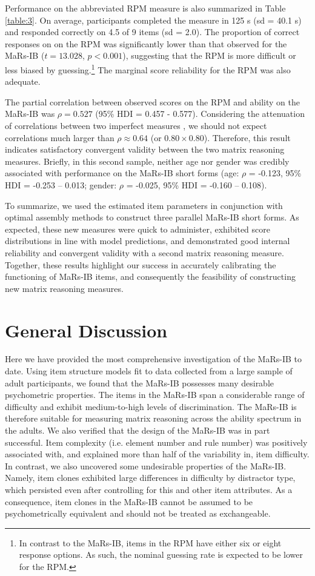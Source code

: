 \documentclass[a4paper,man,natbib]{apa6}
\begin{document}
Performance on the abbreviated RPM measure is also summarized in Table \ref{table:3}. On average, participants completed the measure in 125 s (sd = 40.1 s) and responded correctly on 4.5 of 9 items (sd = 2.0). The proportion of correct responses on on the RPM was significantly lower than that observed for the MaRs-IB ($t = 13.028$, $p < 0.001$), suggesting that the RPM is more difficult or less biased by guessing.\footnote{In contrast to the MaRs-IB, items in the RPM have either six or eight response options. As such, the nominal guessing rate is expected to be lower for the RPM.} The marginal score reliability for the RPM was also adequate.

The partial correlation between observed scores on the RPM and ability on the MaRs-IB was $\rho = 0.527$ (95\% HDI = 0.457 - 0.577). Considering the attenuation of correlations between two imperfect measures \citep{spearman1961proof}, we should not expect correlations much larger than $\rho \approx 0.64$ (or $0.80 \times 0.80$). Therefore, this result indicates satisfactory convergent validity between the two matrix reasoning measures. Briefly, in this second sample, neither age nor gender was credibly associated with performance on the MaRs-IB short forms (age: $\rho$ = -0.123, 95\% HDI = -0.253 -- 0.013; gender: $\rho$ = -0.025, 95\% HDI = -0.160 -- 0.108). 

To summarize, we used the estimated item parameters in conjunction with optimal assembly methods to construct three parallel MaRs-IB short forms. As expected, these new measures were quick to administer, exhibited score distributions in line with model predictions, and demonstrated good internal reliability and convergent validity with a second matrix reasoning measure. Together, these results highlight our success in accurately calibrating the functioning of MaRs-IB items, and consequently the feasibility of constructing new matrix reasoning measures.

\section{General Discussion}

Here we have provided the most comprehensive investigation of the MaRs-IB to date. Using item structure models fit to data collected from a large sample of adult participants, we found that the MaRs-IB possesses many desirable psychometric properties. The items in the MaRs-IB span a considerable range of difficulty and exhibit medium-to-high levels of discrimination. The MaRs-IB is therefore suitable for measuring matrix reasoning across the ability spectrum in the adults. We also verified that the design of the MaRs-IB was in part successful. Item complexity (i.e. element number and rule number) was positively associated with, and explained more than half of the variability in, item difficulty. In contrast, we also uncovered some undesirable properties of the MaRs-IB. Namely, item clones exhibited large differences in difficulty by distractor type, which persisted even after controlling for this and other item attributes. As a consequence, item clones in the MaRs-IB cannot be assumed to be psychometrically equivalent and should not be treated as exchangeable. 
\end{document}
